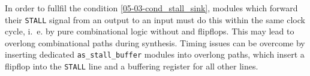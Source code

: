 In order to fullfil the condition \ref{05-03-cond_stall_sink}, modules which forward their \texttt{STALL} signal from an output to an input must do this within the same clock cycle, i.~e. by pure combinational logic without and flipflops. This may lead to overlong combinational paths during synthesis. Timing issues can be overcome by inserting dedicated \texttt{as\_stall\_buffer} modules into overlong paths, which insert a flipflop into the \texttt{STALL} line and a buffering register for all other lines.


%
%
%
%
%   
%   

